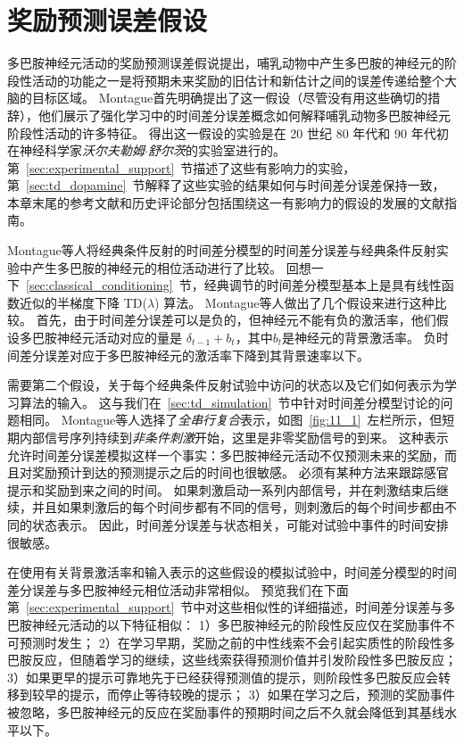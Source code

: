 \section{奖励预测误差假设}

多巴胺神经元活动的奖励预测误差假说提出，哺乳动物中产生多巴胺的神经元的阶段性活动的功能之一是将预期未来奖励的旧估计和新估计之间的误差传递给整个大脑的目标区域。
Montague\cite{montague1996framework}首先明确提出了这一假设（尽管没有用这些确切的措辞），他们展示了强化学习中的时间差分误差概念如何解释哺乳动物多巴胺神经元阶段性活动的许多特征。
得出这一假设的实验是在 20 世纪 80 年代和 90 年代初在神经科学家\textit{沃尔夫勒姆$\cdot$舒尔茨}的实验室进行的。
第~\ref{sec:experimental_support}~节描述了这些有影响力的实验，第~\ref{sec:td_dopamine}~节解释了这些实验的结果如何与时间差分误差保持一致，本章末尾的参考文献和历史评论部分包括围绕这一有影响力的假设的发展的文献指南。


Montague\cite{montague1996framework}等人将经典条件反射的时间差分模型的时间差分误差与经典条件反射实验中产生多巴胺的神经元的相位活动进行了比较。
回想一下~\ref{sec:classical_conditioning}~节，经典调节的时间差分模型基本上是具有线性函数近似的半梯度下降 TD($ \lambda $) 算法。
Montague等人做出了几个假设来进行这种比较。
首先，由于时间差分误差可以是负的，但神经元不能有负的激活率，他们假设多巴胺神经元活动对应的量是 $ \delta_{t-1} + b_t $，其中$ b_t $是神经元的背景激活率。
负时间差分误差对应于多巴胺神经元的激活率下降到其背景速率以下。



需要第二个假设，关于每个经典条件反射试验中访问的状态以及它们如何表示为学习算法的输入。
这与我们在~\ref{sec:td_simulation}~节中针对时间差分模型讨论的问题相同。 
Montague等人选择了\textit{全串行复合}表示，如图~\ref{fig:11_1}~左栏所示，但短期内部信号序列持续到\textit{非条件刺激}开始，这里是非零奖励信号的到来。
这种表示允许时间差分误差模拟这样一个事实：多巴胺神经元活动不仅预测未来的奖励，而且对奖励预计到达的预测提示之后的时间也很敏感。
必须有某种方法来跟踪感官提示和奖励到来之间的时间。
如果刺激启动一系列内部信号，并在刺激结束后继续，并且如果刺激后的每个时间步都有不同的信号，则刺激后的每个时间步都由不同的状态表示。
因此，时间差分误差与状态相关，可能对试验中事件的时间安排很敏感。


在使用有关背景激活率和输入表示的这些假设的模拟试验中，时间差分模型的时间差分误差与多巴胺神经元相位活动非常相似。
预览我们在下面第~\ref{sec:experimental_support}~节中对这些相似性的详细描述，时间差分误差与多巴胺神经元活动的以下特征相似：
1）多巴胺神经元的阶段性反应仅在奖励事件不可预测时发生；
2）在学习早期，奖励之前的中性线索不会引起实质性的阶段性多巴胺反应，但随着学习的继续，这些线索获得预测价值并引发阶段性多巴胺反应；
3）如果更早的提示可靠地先于已经获得预测值的提示，则阶段性多巴胺反应会转移到较早的提示，而停止等待较晚的提示；
3）如果在学习之后，预测的奖励事件被忽略，多巴胺神经元的反应在奖励事件的预期时间之后不久就会降低到其基线水平以下。



